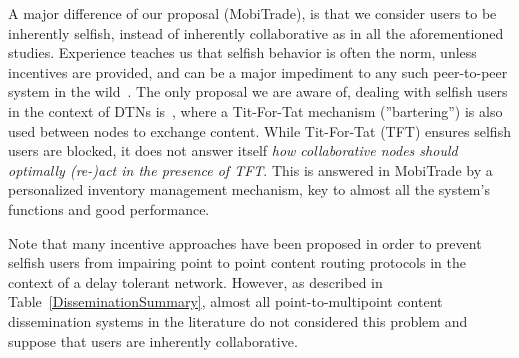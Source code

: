 A major difference of our proposal (MobiTrade), is that we consider users to be inherently selfish, instead of inherently collaborative as in all the aforementioned studies. Experience teaches us that selfish behavior is often the norm, unless incentives are provided, and can be a major impediment to any such peer-to-peer system in the wild~\cite{NashEquilibria}. The only proposal we are aware of, dealing with selfish users in the context of DTNs is~\cite{BarterDTN}, where a Tit-For-Tat mechanism (''bartering'') is also used between nodes to exchange content. While Tit-For-Tat (TFT) ensures selfish users are blocked, it does not answer itself \emph{how collaborative nodes should optimally (re-)act in the presence of TFT}. This is answered in MobiTrade by a personalized inventory management mechanism, key to almost all the system's functions and good performance.

Note that many incentive approaches have been proposed in order to prevent selfish users from impairing point to point content routing protocols in the context of a delay tolerant network. However, as described in Table~\ref{DisseminationSummary}, almost all point-to-multipoint content dissemination systems in the literature do not considered this problem and suppose that users are inherently collaborative.

